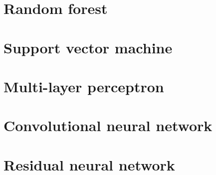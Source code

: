 \section{Random forest}
\section{Support vector machine}
\section{Multi-layer perceptron}
\section{Convolutional neural network}
\section{Residual neural network}
